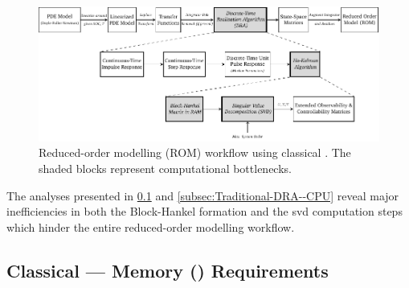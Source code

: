 \begin{figure}[!htbp]
    \centering
    \includegraphics[width=\textwidth]{traditional_dra.pdf}
    \caption[%
    Reduced-order modelling (ROM) workflow using classical .
    ]%
    {%
        Reduced-order modelling (ROM) workflow using classical
        . The shaded blocks represent computational bottlenecks.
    }%
    \label{fig:traditional_ROM_Workflow}
\end{figure}

The    analyses     presented    in \cref{subsec:Traditional-DRA--Memory}    and
\cref{subsec:Traditional-DRA--CPU}  reveal  major  inefficiencies  in  both  the
Block-Hankel  formation and  the \gls{svd}  computation steps  which hinder  the
entire reduced-order modelling workflow.

\subsection{Classical  --- Memory () Requirements}\label{subsec:Traditional-DRA--Memory}





